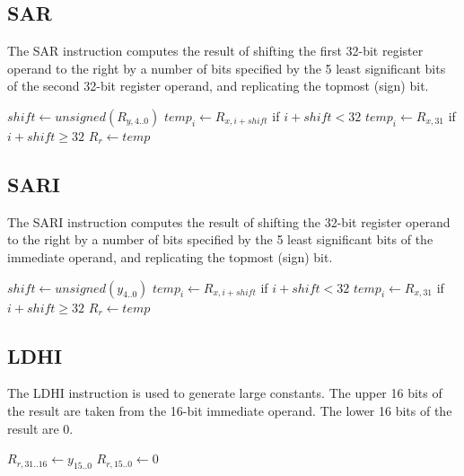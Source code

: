 \subsection{SAR}

The SAR instruction computes the result of shifting the first 32-bit register operand to the right by a number of bits specified by the 5 least significant bits of the second 32-bit register operand, and replicating the topmost (sign) bit.\\


\begin{effectize}
\effect $shift \leftarrow unsigned(R_{y,4..0})$
\effect $temp_i \leftarrow R_{x,i+shift}$ if $i + shift < 32$
\effect $temp_i \leftarrow R_{x,31}$ if $i + shift \geq 32$
\effect $R_r \leftarrow temp$
\end{effectize}

\subsection{SARI}

The SARI instruction computes the result of shifting the 32-bit register operand to the right by a number of bits specified by the 5 least significant bits of the immediate operand, and replicating the topmost (sign) bit.\\


\begin{effectize}
\effect $shift \leftarrow unsigned(y_{4..0})$
\effect $temp_i \leftarrow R_{x,i+shift}$ if $i + shift < 32$
\effect $temp_i \leftarrow R_{x,31}$ if $i + shift \geq 32$
\effect $R_r \leftarrow temp$
\end{effectize}

\subsection{LDHI}

The LDHI instruction is used to generate large constants. The upper 16 bits of the result are taken from the 16-bit immediate operand. The lower 16 bits of the result are 0.\\


\begin{effectize}
\effect $R_{r,31..16} \leftarrow y_{15..0}$
\effect $R_{r,15..0} \leftarrow 0$
\end{effectize}
